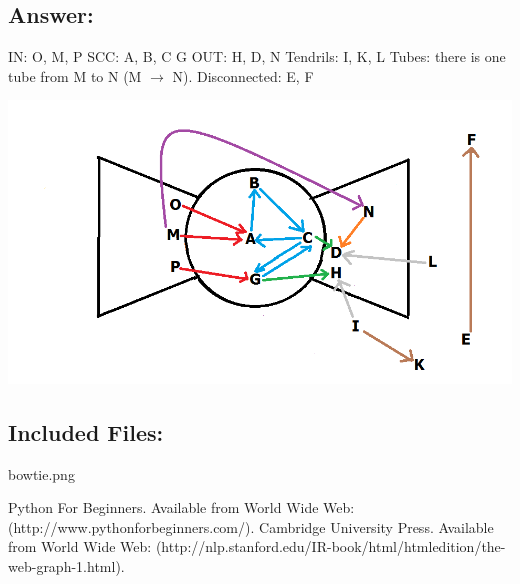 \documentclass[a4paper, 11pt]{article}
\begin{document}
\subsection*{Answer:}
IN: O, M, P
\noindent
\newline
SCC: A, B, C G
\noindent
\newline
OUT: H, D, N
\noindent
\newline
Tendrils: I, K, L
\noindent
\newline
Tubes: there is one tube from M to N (M $\longrightarrow$ N).
\noindent
\newline
Disconnected: E, F
\begin{center}
\includegraphics[scale=0.5]{bowtie.png}
\end{center}
\subsection*{Included Files:}
bowtie.png

\begin{thebibliography}{9}
 Python For Beginners. Available from World Wide Web:(http://www.pythonforbeginners.com/).
 Cambridge University Press. Available from World Wide Web: (http://nlp.stanford.edu/IR-book/html/htmledition/the-web-graph-1.html).
\end{thebibliography}
\end{document}
